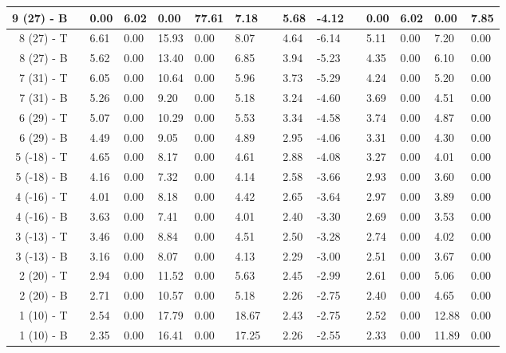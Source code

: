 \begin{table}[H]
\begin{longtable}{@{}rllllllllllllll@{}}
   9 (27) - B &&    0.00 &    6.02 &    0.00 &   77.61 &  7.18 && 5.68 & -4.12 &&     0.00 &     6.02 &     0.00 &     7.85 \\\midrule
   8 (27) - T &&    6.61 &    0.00 &   15.93 &    0.00 &  8.07 && 4.64 & -6.14 &&     5.11 &     0.00 &     7.20 &     0.00 \\
   8 (27) - B &&    5.62 &    0.00 &   13.40 &    0.00 &  6.85 && 3.94 & -5.23 &&     4.35 &     0.00 &     6.10 &     0.00 \\\midrule
   7 (31) - T &&    6.05 &    0.00 &   10.64 &    0.00 &  5.96 && 3.73 & -5.29 &&     4.24 &     0.00 &     5.20 &     0.00 \\
   7 (31) - B &&    5.26 &    0.00 &    9.20 &    0.00 &  5.18 && 3.24 & -4.60 &&     3.69 &     0.00 &     4.51 &     0.00 \\\midrule
   6 (29) - T &&    5.07 &    0.00 &   10.29 &    0.00 &  5.53 && 3.34 & -4.58 &&     3.74 &     0.00 &     4.87 &     0.00 \\
   6 (29) - B &&    4.49 &    0.00 &    9.05 &    0.00 &  4.89 && 2.95 & -4.06 &&     3.31 &     0.00 &     4.30 &     0.00 \\\midrule
  5 (-18) - T &&    4.65 &    0.00 &    8.17 &    0.00 &  4.61 && 2.88 & -4.08 &&     3.27 &     0.00 &     4.01 &     0.00 \\
  5 (-18) - B &&    4.16 &    0.00 &    7.32 &    0.00 &  4.14 && 2.58 & -3.66 &&     2.93 &     0.00 &     3.60 &     0.00 \\\midrule
  4 (-16) - T &&    4.01 &    0.00 &    8.18 &    0.00 &  4.42 && 2.65 & -3.64 &&     2.97 &     0.00 &     3.89 &     0.00 \\
  4 (-16) - B &&    3.63 &    0.00 &    7.41 &    0.00 &  4.01 && 2.40 & -3.30 &&     2.69 &     0.00 &     3.53 &     0.00 \\\midrule
  3 (-13) - T &&    3.46 &    0.00 &    8.84 &    0.00 &  4.51 && 2.50 & -3.28 &&     2.74 &     0.00 &     4.02 &     0.00 \\
  3 (-13) - B &&    3.16 &    0.00 &    8.07 &    0.00 &  4.13 && 2.29 & -3.00 &&     2.51 &     0.00 &     3.67 &     0.00 \\\midrule
   2 (20) - T &&    2.94 &    0.00 &   11.52 &    0.00 &  5.63 && 2.45 & -2.99 &&     2.61 &     0.00 &     5.06 &     0.00 \\
   2 (20) - B &&    2.71 &    0.00 &   10.57 &    0.00 &  5.18 && 2.26 & -2.75 &&     2.40 &     0.00 &     4.65 &     0.00 \\\midrule
   1 (10) - T &&    2.54 &    0.00 &   17.79 &    0.00 & 18.67 && 2.43 & -2.75 &&     2.52 &     0.00 &    12.88 &     0.00 \\
   1 (10) - B &&    2.35 &    0.00 &   16.41 &    0.00 & 17.25 && 2.26 & -2.55 &&     2.33 &     0.00 &    11.89 &     0.00 \\\midrule
\end{longtable}
\end{table}